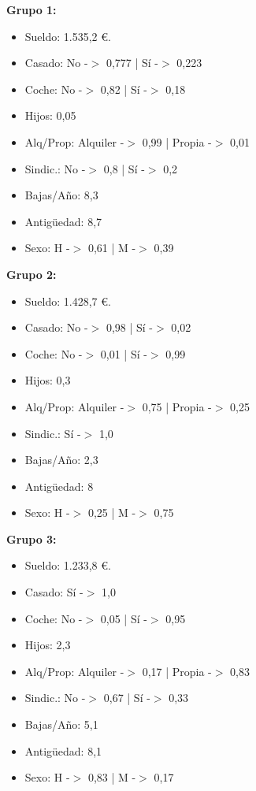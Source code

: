 \documentclass{article}
\begin{document}
\begin{tcolorbox}
  {\LARGE \textbf{Grupo 1:}}
  \begin{itemize}
  \item Sueldo: 1.535,2 €.
  \item Casado: No -$>$ 0,777 | Sí -$>$ 0,223
  \item Coche: No -$>$ 0,82 | Sí -$>$ 0,18
  \item Hijos: 0,05
  \item Alq/Prop: Alquiler -$>$ 0,99 | Propia -$>$ 0,01
  \item Sindic.: No -$>$ 0,8 | Sí -$>$ 0,2
  \item Bajas/Año: 8,3
  \item Antigüedad: 8,7
  \item Sexo: H -$>$ 0,61 | M -$>$ 0,39
  \end{itemize}
\end{tcolorbox}

\begin{tcolorbox}
  {\LARGE \textbf{Grupo 2:}}
  \begin{itemize}
  \item Sueldo: 1.428,7 €.
  \item Casado: No -$>$ 0,98 | Sí -$>$ 0,02
  \item Coche: No -$>$ 0,01 | Sí -$>$ 0,99
  \item Hijos: 0,3
  \item Alq/Prop: Alquiler -$>$ 0,75 | Propia -$>$ 0,25
  \item Sindic.: Sí -$>$ 1,0
  \item Bajas/Año: 2,3
  \item Antigüedad: 8
  \item Sexo: H -$>$ 0,25 | M -$>$ 0,75
  \end{itemize}
\end{tcolorbox}

\begin{tcolorbox}
  {\LARGE \textbf{Grupo 3:}}
  \begin{itemize}
  \item Sueldo: 1.233,8 €.
  \item Casado: Sí -$>$ 1,0
  \item Coche: No -$>$ 0,05 | Sí -$>$ 0,95
  \item Hijos: 2,3
  \item Alq/Prop: Alquiler -$>$ 0,17 | Propia -$>$ 0,83
  \item Sindic.: No -$>$ 0,67 | Sí -$>$ 0,33
  \item Bajas/Año: 5,1
  \item Antigüedad: 8,1
  \item Sexo: H -$>$ 0,83 | M -$>$ 0,17
  \end{itemize}
\end{tcolorbox}
\end{document}

